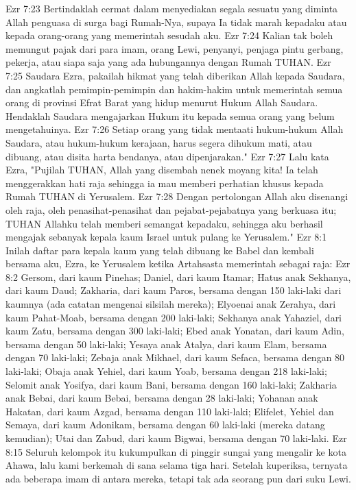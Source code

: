 Ezr 7:23  Bertindaklah cermat dalam menyediakan segala sesuatu yang diminta Allah penguasa di surga bagi Rumah-Nya, supaya Ia tidak marah kepadaku atau kepada orang-orang yang memerintah sesudah aku.
Ezr 7:24  Kalian tak boleh memungut pajak dari para imam, orang Lewi, penyanyi, penjaga pintu gerbang, pekerja, atau siapa saja yang ada hubungannya dengan Rumah TUHAN.
Ezr 7:25  Saudara Ezra, pakailah hikmat yang telah diberikan Allah kepada Saudara, dan angkatlah pemimpin-pemimpin dan hakim-hakim untuk memerintah semua orang di provinsi Efrat Barat yang hidup menurut Hukum Allah Saudara. Hendaklah Saudara mengajarkan Hukum itu kepada semua orang yang belum mengetahuinya.
Ezr 7:26  Setiap orang yang tidak mentaati hukum-hukum Allah Saudara, atau hukum-hukum kerajaan, harus segera dihukum mati, atau dibuang, atau disita harta bendanya, atau dipenjarakan."
Ezr 7:27  Lalu kata Ezra, "Pujilah TUHAN, Allah yang disembah nenek moyang kita! Ia telah menggerakkan hati raja sehingga ia mau memberi perhatian khusus kepada Rumah TUHAN di Yerusalem.
Ezr 7:28  Dengan pertolongan Allah aku disenangi oleh raja, oleh penasihat-penasihat dan pejabat-pejabatnya yang berkuasa itu; TUHAN Allahku telah memberi semangat kepadaku, sehingga aku berhasil mengajak sebanyak kepala kaum Israel untuk pulang ke Yerusalem."
Ezr 8:1  Inilah daftar para kepala kaum yang telah dibuang ke Babel dan kembali bersama aku, Ezra, ke Yerusalem ketika Artahsasta memerintah sebagai raja:
Ezr 8:2  Gersom, dari kaum Pinehas; Daniel, dari kaum Itamar; Hatus anak Sekhanya, dari kaum Daud; Zakharia, dari kaum Paros, bersama dengan 150 laki-laki dari kaumnya (ada catatan mengenai silsilah mereka); Elyoenai anak Zerahya, dari kaum Pahat-Moab, bersama dengan 200 laki-laki; Sekhanya anak Yahaziel, dari kaum Zatu, bersama dengan 300 laki-laki; Ebed anak Yonatan, dari kaum Adin, bersama dengan 50 laki-laki; Yesaya anak Atalya, dari kaum Elam, bersama dengan 70 laki-laki; Zebaja anak Mikhael, dari kaum Sefaca, bersama dengan 80 laki-laki; Obaja anak Yehiel, dari kaum Yoab, bersama dengan 218 laki-laki; Selomit anak Yosifya, dari kaum Bani, bersama dengan 160 laki-laki; Zakharia anak Bebai, dari kaum Bebai, bersama dengan 28 laki-laki; Yohanan anak Hakatan, dari kaum Azgad, bersama dengan 110 laki-laki; Elifelet, Yehiel dan Semaya, dari kaum Adonikam, bersama dengan 60 laki-laki (mereka datang kemudian); Utai dan Zabud, dari kaum Bigwai, bersama dengan 70 laki-laki.
Ezr 8:15  Seluruh kelompok itu kukumpulkan di pinggir sungai yang mengalir ke kota Ahawa, lalu kami berkemah di sana selama tiga hari. Setelah kuperiksa, ternyata ada beberapa imam di antara mereka, tetapi tak ada seorang pun dari suku Lewi.
